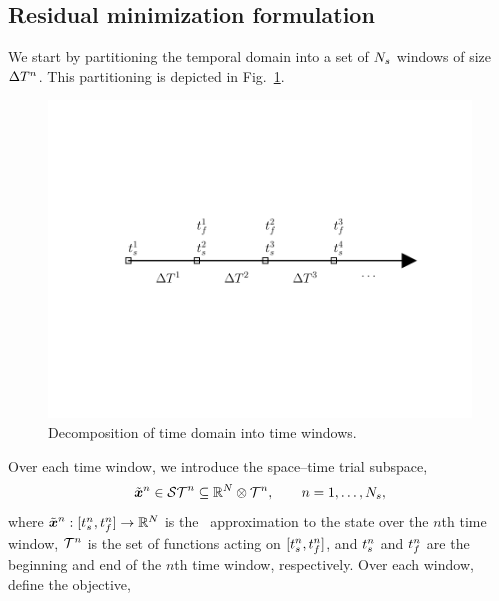 \subsection{Residual minimization formulation} 
We start by partitioning the
temporal domain into a set of $N_s$ windows of size $\Delta T^{n}$. This partitioning is depicted in Fig.~\ref{fig:slab_fig}.
\begin{figure} 
\begin{centering} 
\includegraphics[trim={0.0cm 5cm 0cm 3cm},clip,width=1.0\textwidth]{figs/time_grid.pdf} \caption{Decomposition of time
domain into time windows.} \label{fig:slab_fig} \end{centering} 
\end{figure}
Over each time window, we introduce the space--time trial subspace,
$$\tilde{\boldsymbol x}^n \in \mathcal{ ST }^n \subseteq \mathbb{R}^{N} \otimes \mathcal{T}^{n} , \qquad  n = 1,\ldots,N_s,$$ 
where $\tilde{\boldsymbol x}^n :  [t_s^{n} , t_f^{n}] \rightarrow
\mathbb{R}^{N}$
is the \methodAcronym\ approximation to the state over the $n$th time window, $\mathcal{T}^{n}$ is the set of functions acting on $[t_s^{n},t_f^{n}]$, and  
$t_s^{n}$ and $t_f^{n}$ are the beginning and end of the $n$th
time window, respectively. Over each window, define the objective,
